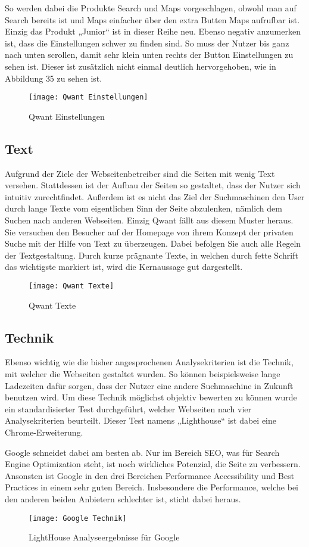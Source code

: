 So werden dabei die
Produkte Search und Maps vorgeschlagen, obwohl man auf Search bereits ist und Maps einfacher über den extra Butten Maps
aufrufbar ist. Einzig das Produkt „Junior“ ist in dieser Reihe neu. Ebenso negativ anzumerken ist, dass die Einstellungen
schwer zu finden sind. So muss der Nutzer bis ganz nach unten scrollen, damit sehr klein unten rechts der Button Einstellungen
zu sehen ist. Dieser ist zusätzlich nicht einmal deutlich hervorgehoben, wie in Abbildung {35} zu sehen ist.
\begin{figure}[h]
    \centering
    \texttt{[image: Qwant Einstellungen]}
    \caption{Qwant Einstellungen}
\end{figure}

\subsection{Text}
Aufgrund der Ziele der Webseitenbetreiber sind die Seiten mit wenig Text versehen. Stattdessen ist der Aufbau der Seiten
so gestaltet, dass der Nutzer sich intuitiv zurechtfindet. Außerdem ist es nicht das Ziel der Suchmaschinen den User durch
lange Texte vom eigentlichen Sinn der Seite abzulenken, nämlich dem Suchen nach anderen Webseiten. Einzig Qwant fällt aus
diesem Muster heraus. Sie versuchen den Besucher auf der Homepage von ihrem Konzept der privaten Suche mit der Hilfe von
Text zu überzeugen. Dabei befolgen Sie auch alle Regeln der Textgestaltung\cite[Seite 5ff]{Maulhardt.20220621b}. Durch kurze prägnante Texte,
in welchen durch fette Schrift das wichtigste markiert ist, wird die Kernaussage gut dargestellt.
\begin{figure}[h]
    \centering
    \texttt{[image: Qwant Texte]}
    \caption{Qwant Texte}
\end{figure}

\subsection{Technik}
Ebenso wichtig wie die bisher angesprochenen Analysekriterien ist die Technik, mit welcher die Webseiten gestaltet wurden.
So können beispielsweise lange Ladezeiten dafür sorgen, dass der Nutzer eine andere Suchmaschine in Zukunft benutzen wird.
Um diese Technik möglichst objektiv bewerten zu können wurde ein standardisierter Test durchgeführt, welcher Webseiten nach
vier Analysekriterien beurteilt. Dieser Test namens „Lighthouse“ ist dabei eine Chrome-Erweiterung.

Google schneidet dabei am besten ab. Nur im Bereich SEO, was für Search Engine Optimization steht, ist noch wirkliches
Potenzial, die Seite zu verbessern. Ansonsten ist Google in den drei Bereichen Performance Accessibility und Best Practices
in einem sehr guten Bereich. Insbesondere die Performance, welche bei den anderen beiden Anbietern schlechter ist,
sticht dabei heraus.
\begin{figure}[h]
    \centering
    \texttt{[image: Google Technik]}
    \caption{LightHouse Analyseergebnisse für Google}
\end{figure}

